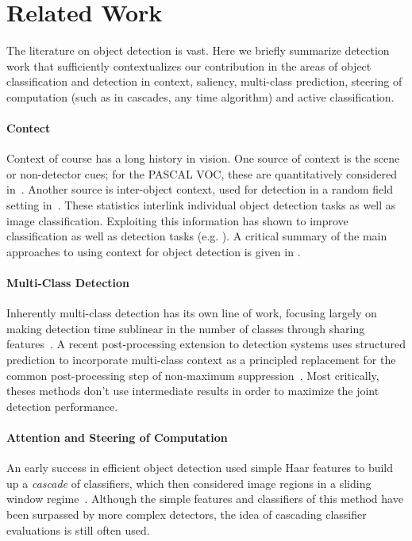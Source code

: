 \section{Related Work}

The literature on object detection is vast.
Here we briefly summarize detection work that sufficiently contextualizes our contribution in the areas of object classification and detection in context, saliency, multi-class prediction, steering of computation (such as in cascades, any time algorithm) and active classification.

\paragraph{Contect}
Context of course has a long history in vision.
One source of context is the scene or non-detector cues; for the PASCAL VOC, these are quantitatively considered in~\cite{Divvala2009}. 
Another source is inter-object context, used for detection in a random field setting in~\cite{Torralba2004}. These  statistics interlink individual object detection tasks as well as image classification. Exploiting this information has shown to improve classification as well as detection tasks (e.g. \cite{Torralba, visual phrases}).
A critical summary of the main approaches to using context for object detection is given in \cite{Galleguillos2010}.

\paragraph{Multi-Class Detection}
Inherently multi-class detection has its own line of work, focusing largely on making detection time sublinear in the number of classes through sharing features~\cite{Torralba2007,Fan2005,Razavi2011}.
A recent post-processing extension to detection systems uses structured prediction to incorporate multi-class context as a principled replacement for the common post-processing step of non-maximum suppression~\cite{Desai2009}. Most critically, theses methods don't use intermediate results in order to maximize the joint detection performance.

\paragraph{Attention and Steering of Computation}
An early success in efficient object detection used simple Haar features to build up a \emph{cascade} of classifiers, which then considered image regions in a sliding window regime~\cite{Viola2001}.
Although the simple features and classifiers of this method have been surpassed by more complex detectors, the idea of cascading classifier evaluations is still often used.

